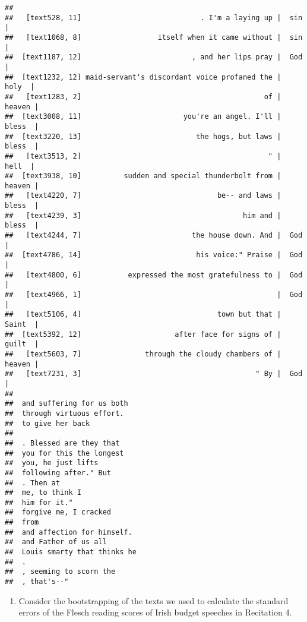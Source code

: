 \documentclass[]{article}
\providecommand{\tightlist}{%
  \setlength{\itemsep}{0pt}\setlength{\parskip}{0pt}}
\begin{document}
\begin{verbatim}
##                                                                        
##   [text528, 11]                            . I'm a laying up |  sin   |
##   [text1068, 8]                  itself when it came without |  sin   |
##  [text1187, 12]                          , and her lips pray |  God   |
##  [text1232, 12] maid-servant's discordant voice profaned the |  holy  |
##   [text1283, 2]                                           of | heaven |
##  [text3008, 11]                        you're an angel. I'll | bless  |
##  [text3220, 13]                           the hogs, but laws | bless  |
##   [text3513, 2]                                            " |  hell  |
##  [text3938, 10]          sudden and special thunderbolt from | heaven |
##   [text4220, 7]                                be-- and laws | bless  |
##   [text4239, 3]                                      him and | bless  |
##   [text4244, 7]                          the house down. And |  God   |
##  [text4786, 14]                           his voice:" Praise |  God   |
##   [text4800, 6]           expressed the most gratefulness to |  God   |
##   [text4966, 1]                                              |  God   |
##   [text5106, 4]                                town but that | Saint  |
##  [text5392, 12]                      after face for signs of | guilt  |
##   [text5603, 7]               through the cloudy chambers of | heaven |
##   [text7231, 3]                                         " By |  God   |
##                             
##  and suffering for us both  
##  through virtuous effort.   
##  to give her back           
##                             
##  . Blessed are they that    
##  you for this the longest   
##  you, he just lifts         
##  following after." But      
##  . Then at                  
##  me, to think I             
##  him for it."               
##  forgive me, I cracked      
##  from                       
##  and affection for himself. 
##  and Father of us all       
##  Louis smarty that thinks he
##  .                          
##  , seeming to scorn the     
##  , that's--"
\end{verbatim}

\begin{enumerate}
\def\labelenumi{\arabic{enumi}.}
\setcounter{enumi}{9}
\tightlist
\item
  Consider the bootstrapping of the texts we used to calculate the
  standard errors of the Flesch reading scores of Irish budget speeches
  in Recitation 4.
\end{enumerate}
\end{document}
